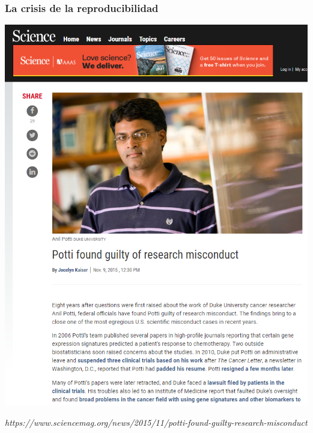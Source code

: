 \documentclass[9pt]{beamer}
\begin{document}
\begin{frame}
  \frametitle{La crisis de la reproducibilidad}
  \begin{center}
    \includegraphics[height=0.85\textheight]{images/potti_portada_1}
  \end{center}
  \hfill\begin{minipage}[h]{0.8\linewidth}
    {\tiny \textit{https://www.sciencemag.org/news/2015/11/potti-found-guilty-research-misconduct}}
  \end{minipage}
\end{frame}
\end{document}
